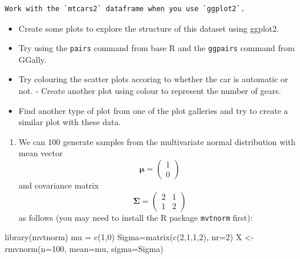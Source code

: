 \documentclass[
]{book}
\newenvironment{Shaded}{\begin{snugshade}}{\end{snugshade}}
\newcommand{\AttributeTok}[1]{\textcolor[rgb]{0.77,0.63,0.00}{#1}}
\newcommand{\DecValTok}[1]{\textcolor[rgb]{0.00,0.00,0.81}{#1}}
\newcommand{\FunctionTok}[1]{\textcolor[rgb]{0.00,0.00,0.00}{#1}}
\newcommand{\NormalTok}[1]{#1}
\newcommand{\OtherTok}[1]{\textcolor[rgb]{0.56,0.35,0.01}{#1}}
\providecommand{\tightlist}{%
  \setlength{\itemsep}{0pt}\setlength{\parskip}{0pt}}
\theoremstyle{definition}
\theoremstyle{definition}
\theoremstyle{definition}
\theoremstyle{definition}
\theoremstyle{remark}
\begin{document}
\begin{verbatim}
Work with the `mtcars2` dataframe when you use `ggplot2`.
\end{verbatim}

\begin{itemize}
\tightlist
\item
  Create some plots to explore the structure of this dataset using ggplot2.
\item
  Try using the \texttt{pairs} command from base R and the \texttt{ggpairs} command from GGally.
\item
  Try colouring the scatter plots accoring to whether the car is automatic or not. - Create another plot using colour to represent the number of gears.
\item
  Find another type of plot from one of the plot galleries and try to create a similar plot with these data.
\end{itemize}

\begin{enumerate}
\def\labelenumi{\arabic{enumi}.}
\setcounter{enumi}{3}
\tightlist
\item
  We can 100 generate samples from the multivariate normal distribution with mean vector
  \[{\boldsymbol{\mu}}= \left(\begin{array}{c}1\\0\end{array}\right)\]
  and covariance matrix
  \[\boldsymbol{\Sigma}= \left(\begin{array}{cc}2&1\\1&2\end{array}\right)\]
  as follows (you may need to install the R package \texttt{mvtnorm} first):
\end{enumerate}

\begin{Shaded}
\begin{Highlighting}[]
\FunctionTok{library}\NormalTok{(mvtnorm)}
\NormalTok{mu }\OtherTok{=} \FunctionTok{c}\NormalTok{(}\DecValTok{1}\NormalTok{,}\DecValTok{0}\NormalTok{)}
\NormalTok{Sigma}\OtherTok{=}\FunctionTok{matrix}\NormalTok{(}\FunctionTok{c}\NormalTok{(}\DecValTok{2}\NormalTok{,}\DecValTok{1}\NormalTok{,}\DecValTok{1}\NormalTok{,}\DecValTok{2}\NormalTok{), }\AttributeTok{nr=}\DecValTok{2}\NormalTok{)}
\NormalTok{X }\OtherTok{\textless{}{-}} \FunctionTok{rmvnorm}\NormalTok{(}\AttributeTok{n=}\DecValTok{100}\NormalTok{, }\AttributeTok{mean=}\NormalTok{mu, }\AttributeTok{sigma=}\NormalTok{Sigma)}
\end{Highlighting}
\end{Shaded}
\end{document}
